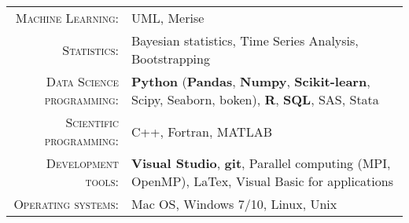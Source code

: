 %
%
%

\renewcommand{\arraystretch}{1.1}

	\begin{tabular}{>{}r>{}p{13cm}} 
		\textsc{Machine Learning:}				        &   UML, Merise\\
		\textsc{Statistics:}					        &   Bayesian statistics, Time Series Analysis, Bootstrapping\\    
		\textsc{Data Science programming:}  		&   \textbf{Python} (\textbf{Pandas}, \textbf{Numpy}, \textbf{Scikit-learn}, Scipy, Seaborn, boken), \textbf{R}, \textbf{SQL}, SAS, Stata\\ 
		\textsc{Scientific programming:}               	&   C++, Fortran, MATLAB\\ 
		\textsc{Development tools:}	  		&   \textbf{Visual Studio},  \textbf{git}, Parallel computing (MPI, OpenMP), LaTex, Visual Basic for applications\\
		\textsc{Operating systems:}	        &   Mac OS, Windows 7/10, Linux, Unix 
	\end{tabular}